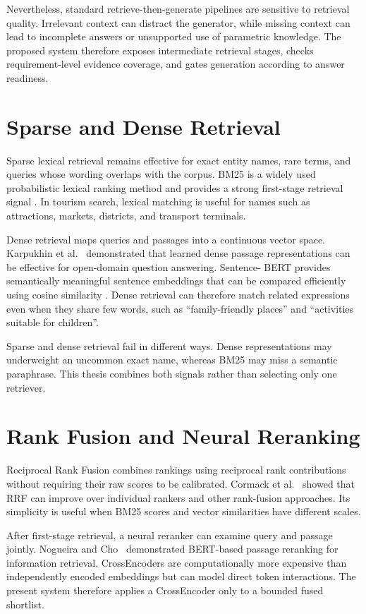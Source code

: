 Nevertheless, standard retrieve-then-generate pipelines are sensitive to
retrieval quality. Irrelevant context can distract the generator, while missing
context can lead to incomplete answers or unsupported use of parametric
knowledge. The proposed system therefore exposes intermediate retrieval stages,
checks requirement-level evidence coverage, and gates generation according to
answer readiness.

\section{Sparse and Dense Retrieval}

Sparse lexical retrieval remains effective for exact entity names, rare terms,
and queries whose wording overlaps with the corpus. BM25 is a widely used
probabilistic lexical ranking method and provides a strong first-stage retrieval
signal \cite{robertson2009bm25}. In tourism search, lexical matching is useful
for names such as attractions, markets, districts, and transport terminals.

Dense retrieval maps queries and passages into a continuous vector space.
Karpukhin et al.~\cite{karpukhin2020dpr} demonstrated that learned dense passage
representations can be effective for open-domain question answering. Sentence-
BERT provides semantically meaningful sentence embeddings that can be compared
efficiently using cosine similarity \cite{reimers2019sentencebert}. Dense
retrieval can therefore match related expressions even when they share few
words, such as ``family-friendly places'' and ``activities suitable for
children''.

Sparse and dense retrieval fail in different ways. Dense representations may
underweight an uncommon exact name, whereas BM25 may miss a semantic paraphrase.
This thesis combines both signals rather than selecting only one retriever.

\section{Rank Fusion and Neural Reranking}

Reciprocal Rank Fusion combines rankings using reciprocal rank contributions
without requiring their raw scores to be calibrated. Cormack et
al.~\cite{cormack2009rrf} showed that RRF can improve over individual rankers
and other rank-fusion approaches. Its simplicity is useful when BM25 scores and
vector similarities have different scales.

After first-stage retrieval, a neural reranker can examine query and passage
jointly. Nogueira and Cho~\cite{nogueira2019bert} demonstrated BERT-based
passage reranking for information retrieval. CrossEncoders are computationally
more expensive than independently encoded embeddings but can model direct token
interactions. The present system therefore applies a CrossEncoder only to a
bounded fused shortlist.

